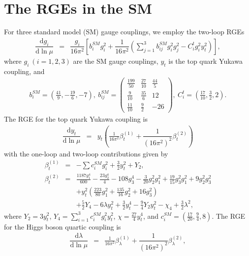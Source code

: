 \documentclass[aps,prd,preprint,superscriptaddress,showpacs,ctexart]{revtex4-1}
\newcommand{\dd}{\mathrm{d}}
\begin{document}
\section{The RGEs in the SM}
For three standard model (SM) gauge couplings, we employ the two-loop
RGEs~\cite{AMALDO1992374,Barger:1992ac}
\begin{eqnarray}
\dfrac{\dd g_{i}}{\dd\ln\mu} & = & \dfrac{g_{i}}{16\pi^{2}}\left[b_{i}^{SM}g_{i}^{2}+\dfrac{1}{16\pi^{2}}\left(\sum_{j=1}^{3}b_{ij}^{SM}g_{i}^{2}g_{j}^{2}-C_{i}^{t}g_{i}^{2}y_{t}^{2}\right)\right],\label{1}
\end{eqnarray}
where $g_{i}~(i=1,2,3)$ are the SM gauge couplings, $y_{t}$ is the
top quark Yukawa coupling, and
\begin{eqnarray}
b_{i}^{SM}=\left(\frac{41}{9},-\frac{19}{6},-7\right),~b_{ij}^{SM}=\begin{pmatrix}\frac{199}{50} & \frac{27}{10} & \frac{44}{5}\\
\frac{9}{10} & \frac{35}{6} & 12\\
\frac{11}{10} & \frac{9}{2} & -26
\end{pmatrix},~C_{i}^{t}=\left(\frac{17}{10},\frac{3}{2},2\right).
\end{eqnarray}
The RGE for the top quark Yukawa coupling is
\begin{eqnarray}
\dfrac{\dd y_{t}}{\dd\ln\mu} & = & y_{t}\left(\frac{1}{16\pi^{2}}\beta_{t}^{(1)}+\dfrac{1}{(16\pi^{2})^{2}}\beta_{t}^{(2)}\right)\label{3}
\end{eqnarray}
with the one-loop and two-loop contributions given by
\begin{eqnarray}
\beta_{t}^{(1)} & = & -\sum c_{i}^{SM}g_{i}^{2}+\frac{3}{2}y_{t}^{2}+Y_{2},\\
\beta_{t}^{(2)} & = & \frac{1187g_{1}^{4}}{600}-\frac{23g_{2}^{4}}{4}-108g_{3}^{4}-\frac{3}{20}g_{2}^{2}g_{1}^{2}+\frac{19}{15}g_{3}^{2}g_{1}^{2}+9g_{2}^{2}g_{3}^{2}\nonumber \\
 &  & +y_{t}^{2}\left(\frac{223}{80}g_{1}^{2}+\frac{135}{16}g_{2}^{2}+16g_{3}^{2}\right)\nonumber \\
 &  & +\frac{5}{2}Y_{4}-6\lambda y_{t}^{2}+\frac{3}{2}y_{t}^{4}-\frac{9}{4}Y_{2}y_{t}^{2}-\chi_{4}+\frac{3}{2}\lambda^{2},
\end{eqnarray}
where $Y_{2}=3y_{t}^{2}$, $Y_{4}=\sum_{i=1}^{3}c_{i}^{SM}g_{i}^{2}y_{t}^{2}$,
$\chi=\frac{27}{4}y_{t}^{4}$, and $c_{i}^{SM}=\left(\frac{17}{20},\frac{9}{4},8\right)$.
The RGE for the Higgs boson quartic coupling is
\begin{eqnarray}
\dfrac{\dd\lambda}{\dd\ln\mu} & = & \frac{1}{16\pi^{2}}\beta_{\lambda}^{(1)}+\dfrac{1}{(16\pi^{2})^{2}}\beta_{\lambda}^{(2)},\label{A6}
\end{eqnarray}
\end{document}
